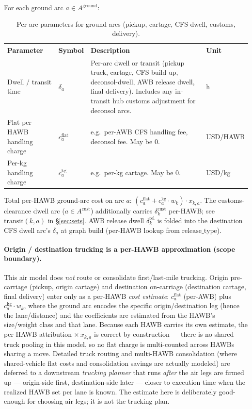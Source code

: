 \documentclass[11pt,a4paper]{article}
\theoremstyle{definition}
\begin{document}
For each ground arc $a \in A^{\text{ground}}$:

\begin{table}[H]
\centering
\caption{Per-arc parameters for ground arcs (pickup, cartage, CFS dwell, customs, delivery).}
\label{tab:ground-arc-params}
\begin{tabular}{p{3.5cm}p{2.2cm}p{6.5cm}p{1.5cm}}
\toprule
Parameter & Symbol & Description & Unit \\
\midrule
Dwell / transit time & $\delta_a$ & Per-arc dwell or transit (pickup truck, cartage, CFS build-up, deconsol-dwell, AWB release dwell, final delivery). Includes any in-transit hub customs adjustment for deconsol arcs. & h \\
Flat per-HAWB handling charge & $c_a^{\text{flat}}$ & e.g.\ per-AWB CFS handling fee, deconsol fee. May be 0. & USD/HAWB \\
Per-kg handling charge & $c_a^{\text{kg}}$ & e.g.\ per-kg cartage. May be 0. & USD/kg \\
\bottomrule
\end{tabular}
\end{table}

Total per-HAWB ground-arc cost on arc $a$: $(c_a^{\text{flat}} + c_a^{\text{kg}}
\cdot w_k) \cdot x_{k,a}$. The customs-clearance dwell arc (\(a \in
A^{\text{cust}}\)) additionally carries $\delta^{\text{cust}}_k$ per-HAWB; see
\(\text{transit}(k, a)\) in \S\ref{sec:sets}. AWB release dwell
$\delta^{\text{rel}}_k$ is folded into the destination CFS dwell arc's
$\delta_a$ at graph build (per-HAWB lookup from $\text{release\_type}$).

\paragraph{Origin / destination trucking is a per-HAWB approximation (scope boundary).}
This air model does \emph{not} route or consolidate first/last-mile trucking.
Origin pre-carriage (pickup, origin cartage) and destination on-carriage
(destination cartage, final delivery) enter only as a per-HAWB \emph{cost
estimate}: $c_a^{\text{flat}}$ (per-AWB) plus $c_a^{\text{kg}} \cdot w_k$, where
the ground arc encodes the specific origin/destination leg (hence the
lane/distance) and the coefficients are estimated from the HAWB's size/weight
class and that lane. Because each HAWB carries its own estimate, the per-HAWB
attribution $\times\, x_{k,a}$ is correct by construction --- there is no
shared-truck pooling in this model, so no flat charge is multi-counted across
HAWBs sharing a move. Detailed truck routing and multi-HAWB consolidation
(where shared-vehicle flat costs and consolidation savings are actually
modeled) are deferred to a downstream \emph{trucking planner} that runs
\emph{after} the air legs are firmed up --- origin-side first, destination-side
later --- closer to execution time when the realized HAWB set per lane is
known. The estimate here is deliberately good-enough for choosing air legs; it
is not the trucking plan.
\end{document}
